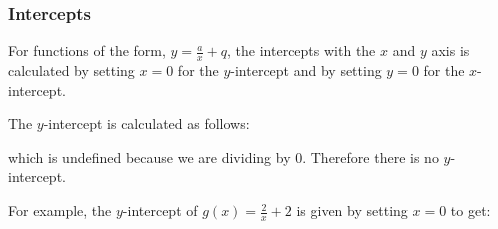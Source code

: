             \subsubsection{ Intercepts}
            \nopagebreak
          \label{m39341*id247720}For functions of the form, $y=\frac{a}{x}+q$, the intercepts with the $x$ and $y$ axis is calculated by setting $x=0$ for the $y$-intercept and by setting $y=0$ for the $x$-intercept.\par 
          \label{m39341*id247814}The $y$-intercept is calculated as follows:\par 
          \label{m39341*uid154}\nopagebreak\noindent{}
          \label{m39341*id247904}which is undefined because we are dividing by 0. Therefore there is no $y$-intercept.\par 
          \label{m39341*id247920}For example, the $y$-intercept of $g\left(x\right)=\frac{2}{x}+2$ is given by setting $x=0$ to get:\par 
